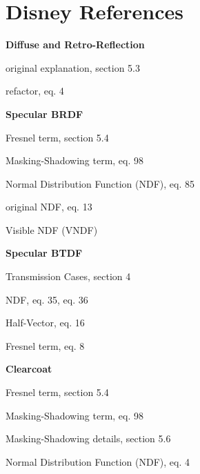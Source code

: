 \chapter{Disney References} \label{app:references}

\begin{list}{-}{}
    \item \textbf{Diffuse and Retro-Reflection}
    \begin{list}{-}{}
        \item original explanation, section 5.3 \cite{burley_physically_2012}
        \item refactor, eq. 4 \cite{burley_extending_2015}
    \end{list}
    \item \textbf{Specular BRDF}
    \begin{list}{-}{}
        \item Fresnel term, section 5.4 \cite{burley_physically_2012}
        \item Masking-Shadowing term, eq. 98 \cite{heitz_understanding_2014}
        \item Normal Distribution Function (NDF), eq. 85 \cite{heitz_understanding_2014}
        \item original NDF, eq. 13 \cite{burley_physically_2012}
        \item Visible NDF (VNDF) \cite{heitz_sampling_2018}
    \end{list}
    \item \textbf{Specular BTDF}
    \begin{list}{-}{}
        \item Transmission Cases, section 4 \cite{walter_microfacet_2007} 
        \item NDF, eq. 35, eq. 36 \cite{walter_microfacet_2007}
        \item Half-Vector, eq. 16 \cite{walter_microfacet_2007}
        \item Fresnel term, eq. 8 \cite{burley_extending_2015}
    \end{list}
    \item \textbf{Clearcoat}
    \begin{list}{-}{}
        \item Fresnel term, section 5.4 \cite{burley_physically_2012}
        \item Masking-Shadowing term, eq. 98 \cite{heitz_understanding_2014}
        \item Masking-Shadowing details, section 5.6 \cite{burley_physically_2012}
        \item Normal Distribution Function (NDF), eq. 4 \cite{burley_physically_2012}

\end{list}
\end{list}
